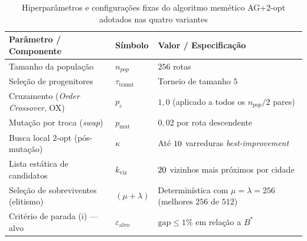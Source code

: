 \begin{table}[htbp]
      \centering
      \caption{Hiperparâmetros e configurações fixas do algoritmo memético AG+\(2\)-opt adotados nas quatro variantes}\label{tbl:ga-hyperparameters}
      \begin{tabelapadrao}
            \begin{tabular}{@{}
                        >{\raggedright\arraybackslash}p{}
                        >{\centering\arraybackslash}p{}
                        >{\raggedright\arraybackslash}p{}@{}}
                  \toprule
                  Parâmetro / Componente                  & Símbolo                    & Valor / Especificação                                                                      \\
                  \midrule
                  Tamanho da população                    & \(n_{pop}\)                & \(256\) rotas                                                                              \\
                  Seleção de progenitores                 & \(\tau_{\text{trnmt}}\)    & Torneio de tamanho \(5\)                                                                   \\
                  Cruzamento (\emph{Order Crossover}, OX) & \(p_c\)                    & \(1{,}0\) (aplicado a todos os \(n_{pop}/2\) pares)                                        \\
                  Mutação por troca (\emph{swap})         & \(p_{\text{mut}}\)         & \(0{,}02\) por rota descendente                                                            \\
                  Busca local \(2\)-opt (pós-mutação)     & \(\kappa\)                 & Até \(10\) varreduras \emph{best-improvement}                                    \\
                  Lista estática de candidatos            & \(k_{\text{viz}}\)         & \(20\) vizinhos mais próximos por cidade                                                \\
                  Seleção de sobreviventes (elitismo)     & \((\mu + \lambda)\)        & Determinística com \(\mu = \lambda = 256\) (melhores \(256\) de \(512\))                   \\
                  Critério de parada (i) --- alvo         & \(\varepsilon_{\text{alvo}}\) & \(\text{gap} \le 1\%\) em relação a \(B^*\)                                             \\

\end{tabular}
\end{tabelapadrao}
\end{table}
